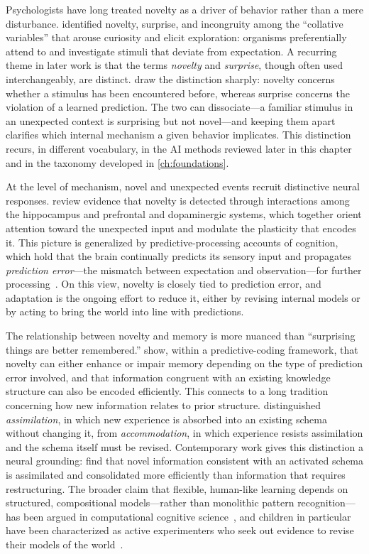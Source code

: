 Psychologists have long treated novelty as a driver of behavior rather than a mere disturbance. \citet{berlyne1960conflict} identified novelty, surprise, and incongruity among the ``collative variables'' that arouse curiosity and elicit exploration: organisms preferentially attend to and investigate stimuli that deviate from expectation. A recurring theme in later work is that the terms \emph{novelty} and \emph{surprise}, though often used interchangeably, are distinct. \citet{barto2013novelty} draw the distinction sharply: novelty concerns whether a stimulus has been encountered before, whereas surprise concerns the violation of a learned prediction. The two can dissociate---a familiar stimulus in an unexpected context is surprising but not novel---and keeping them apart clarifies which internal mechanism a given behavior implicates. This distinction recurs, in different vocabulary, in the AI methods reviewed later in this chapter and in the taxonomy developed in \cref{ch:foundations}.

At the level of mechanism, novel and unexpected events recruit distinctive neural responses. \citet{ranganath2003neural} review evidence that novelty is detected through interactions among the hippocampus and prefrontal and dopaminergic systems, which together orient attention toward the unexpected input and modulate the plasticity that encodes it. This picture is generalized by predictive-processing accounts of cognition, which hold that the brain continually predicts its sensory input and propagates \emph{prediction error}---the mismatch between expectation and observation---for further processing~\citep{clark2013predictive, friston2010free}. On this view, novelty is closely tied to prediction error, and adaptation is the ongoing effort to reduce it, either by revising internal models or by acting to bring the world into line with predictions.

The relationship between novelty and memory is more nuanced than ``surprising things are better remembered.'' \citet{quent2021predictive} show, within a predictive-coding framework, that novelty can either enhance or impair memory depending on the type of prediction error involved, and that information congruent with an existing knowledge structure can also be encoded efficiently. This connects to a long tradition concerning how new information relates to prior structure. \citet{piaget1952origins} distinguished \emph{assimilation}, in which new experience is absorbed into an existing schema without changing it, from \emph{accommodation}, in which experience resists assimilation and the schema itself must be revised. Contemporary work gives this distinction a neural grounding: \citet{sommer2022assimilation} find that novel information consistent with an activated schema is assimilated and consolidated more efficiently than information that requires restructuring. The broader claim that flexible, human-like learning depends on structured, compositional models---rather than monolithic pattern recognition---has been argued in computational cognitive science~\citep{lake2017building}, and children in particular have been characterized as active experimenters who seek out evidence to revise their models of the world~\citep{gopnik2012scientific}.

